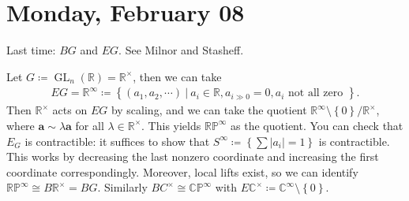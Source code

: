 
\hypertarget{monday-february-08}{%
\section{Monday, February 08}\label{monday-february-08}}

Last time: \(BG\) and \(EG\). See Milnor and Stasheff.

\begin{example}[?]

Let
\(G \coloneqq\operatorname{GL}_n({\mathbb{R}}) = {\mathbb{R}}^{\times}\),
then we can take
\begin{align*}
EG = {\mathbb{R}}^{\infty } \coloneqq\left\{{ (a_1, a_2, \cdots ) {~\mathrel{\Big|}~}a_i \in {\mathbb{R}}, a_{i\gg 0} = 0, a_i \text{ not all zero } }\right\}
.\end{align*}
Then \({\mathbb{R}}^{\times}\) acts on \(EG\) by scaling, and we can
take the quotient
\({\mathbb{R}}^{\infty } \setminus\left\{{0}\right\}/ {\mathbb{R}}^{\times}\),
where \(\mathbf{a} \sim \lambda \mathbf{a}\) for all
\(\lambda \in {\mathbb{R}}^{\times}\). This yields
\({\mathbb{RP}}^{\infty }\) as the quotient. You can check that \(E_G\)
is contractible: it suffices to show that
\(S^{\infty } \coloneqq\left\{{ \sum {\left\lvert {a_i} \right\rvert} = 1 }\right\}\)
is contractible. This works by decreasing the last nonzero coordinate
and increasing the first coordinate correspondingly. Moreover, local
lifts exist, so we can identify
\({\mathbb{RP}}^{\infty } \cong B{\mathbb{R}}^{\times}= BG\). Similarly
\(BC^{\times}\cong {\mathbb{CP}}^{\infty }\) with
\(E{\mathbb{C}}^{\times}\coloneqq{\mathbb{C}}^{\infty } \setminus\left\{{0}\right\}\).

\end{example}

